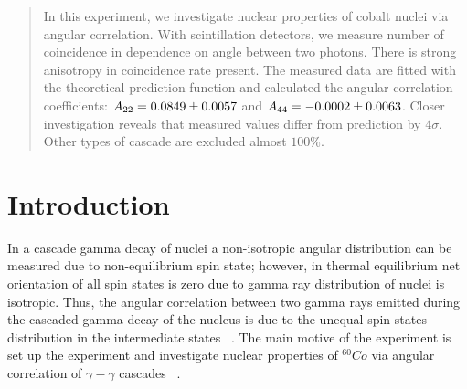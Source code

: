 \begin{abstract}
   In this experiment, we investigate nuclear properties of cobalt nuclei via angular correlation. With scintillation detectors, we measure number of coincidence in dependence on angle between two photons. There is strong anisotropy in coincidence rate present. The measured data are fitted with the theoretical prediction function and calculated the angular correlation coefficients: $ A_{22}= \num{0.0849 +- 0.0057} $ and $A_{44}=\num{-0.0002 +- 0.0063}  $. Closer investigation reveals that measured values differ from prediction by $4\sigma$. Other types of cascade are excluded almost $100\%$.
\end{abstract}

\section{Introduction}
In a cascade gamma decay of nuclei a non-isotropic angular distribution can be measured due to non-equilibrium spin state; however, in thermal equilibrium net orientation of all spin states is zero due to gamma ray distribution of nuclei is isotropic. Thus, the angular correlation between two gamma rays emitted during the cascaded gamma decay of the nucleus is due to the unequal spin states distribution in the intermediate states ~\cite{descr}.
The main motive of the experiment is set up the experiment and investigate nuclear properties of $ ^{60}Co $ via angular correlation of $ \gamma-\gamma $ cascades ~\cite{descr}.
